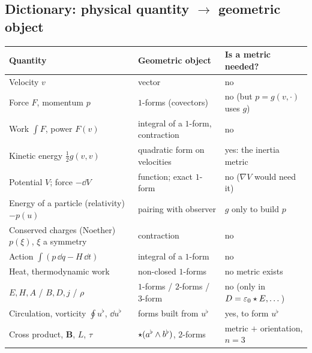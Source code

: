 \subsection{Dictionary: physical quantity $\to$ geometric object}\label{sec:phys-dict}

\begin{center}
\small
\renewcommand{\arraystretch}{1.3}
\begin{tabular}{@{}p{4.6cm}p{4.8cm}p{4.7cm}@{}}
\toprule
\textbf{Quantity} & \textbf{Geometric object} & \textbf{Is a metric needed?}\\
\midrule
Velocity $v$ & vector & no\\
Force $F$, momentum $p$ & $1$-forms (covectors) & no (but $p=g(v,\cdot)$ uses $g$)\\
Work $\int F$, power $F(v)$ & integral of a $1$-form, contraction & no\\
Kinetic energy $\frac12g(v,v)$ & quadratic form on velocities & yes: the inertia metric\\
Potential $V$; force $-\dd V$ & function; exact $1$-form & no ($\nabla V$ would need it)\\
Energy of a particle (relativity) $-p(u)$ & pairing with observer & $g$ only to build $p$\\
Conserved charges (Noether) $p(\xi)$, $\xi$ a symmetry & contraction & no\\
Action $\int(p\,\dd q-H\,\dd t)$ & integral of a $1$-form & no\\
Heat, thermodynamic work & non-closed $1$-forms & no metric exists\\
$E,H,A$ / $B,D,j$ / $\rho$ & $1$-forms / $2$-forms / $3$-form & no (only in $D=\varepsilon_0\star E,\dots$)\\
Circulation, vorticity $\oint u^\flat$, $\dd u^\flat$ & forms built from $u^\flat$ & yes, to form $u^\flat$\\
Cross product, $\mathbf B$, $L$, $\tau$ & $\star(a^\flat\wedge b^\flat)$, $2$-forms & metric $+$ orientation, $n=3$\\
\bottomrule
\end{tabular}
\end{center}
